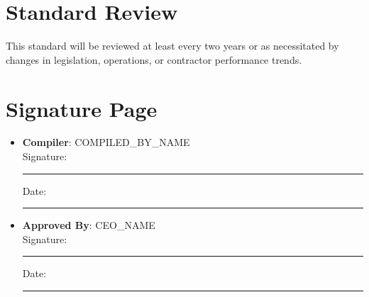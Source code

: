\documentclass[11pt]{article}
\newcommand{\compilerName}{{{COMPILED_BY_NAME}}}
\begin{document}
\section{Standard Review}
This standard will be reviewed at least every two years or as necessitated by changes in legislation, operations, or contractor performance trends.

\section{Signature Page}
\begin{itemize}
  \item \textbf{Compiler}: \compilerName \\
    Signature: \rule{5cm}{0.4pt} \quad Date: \rule{3cm}{0.4pt}
  \item \textbf{Approved By}: {{CEO_NAME}} \\
    Signature: \rule{5cm}{0.4pt} \quad Date: \rule{3cm}{0.4pt}
\end{itemize}
\end{document}
